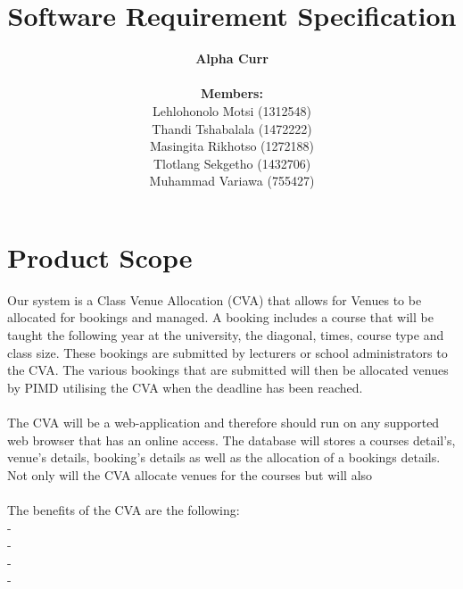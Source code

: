 \documentclass[12pt]{article}
\newenvironment{Project}[2][Project]{\begin{trivlist}
\item[\hskip \labelsep {\bfseries #1}\hskip \labelsep {\bfseries #2.}]}{\end{trivlist}}
\begin{document}
 
 
\title{\textbf{Software Requirement Specification} }
\author{\textbf{Alpha Curr}\\\\\textbf{Members:}\\Lehlohonolo Motsi (1312548)\\Thandi Tshabalala (1472222)\\Masingita Rikhotso (1272188)\\Tlotlang Sekgetho (1432706)\\Muhammad Variawa (755427)}
\maketitle
 


\begin{Project}{: Class Venue Allocation}

\end{Project}

\section{Product Scope}
Our system is a Class Venue Allocation (CVA) that allows for Venues to be allocated for bookings and managed. A booking includes a course that will be taught the following year at the university, the diagonal, times, course type and class size. These bookings are submitted by lecturers or school administrators to the CVA. The various bookings that are submitted will then be allocated venues by PIMD utilising the CVA when the deadline has been reached.\\\\
The CVA will be a web-application and therefore should run on any supported web browser that has an online access. The database will stores a courses detail's, venue's details, booking's details as well as the allocation of a bookings details. Not only will the CVA allocate venues for the courses but will also \\\\
The benefits of the CVA are the following:\\
-\\
-\\
-\\
-\\ 
\end{document}

